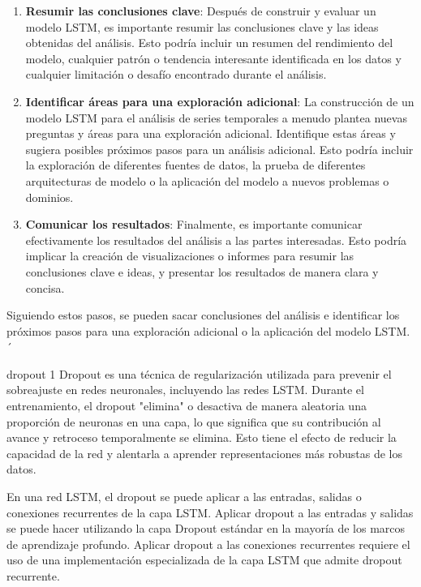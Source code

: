 \documentclass[11pt]{article}
\begin{document}
\begin{enumerate}
\item \textbf{\textbf{Resumir las conclusiones clave}}: Después de construir y evaluar
un modelo LSTM, es importante resumir las conclusiones clave y las
ideas obtenidas del análisis. Esto podría incluir un resumen del
rendimiento del modelo, cualquier patrón o tendencia interesante
identificada en los datos y cualquier limitación o desafío
encontrado durante el análisis.

\item \textbf{\textbf{Identificar áreas para una exploración adicional}}: La
construcción de un modelo LSTM para el análisis de series
temporales a menudo plantea nuevas preguntas y áreas para una
exploración adicional. Identifique estas áreas y sugiera posibles
próximos pasos para un análisis adicional. Esto podría incluir la
exploración de diferentes fuentes de datos, la prueba de diferentes
arquitecturas de modelo o la aplicación del modelo a nuevos
problemas o dominios.

\item \textbf{\textbf{Comunicar los resultados}}: Finalmente, es importante comunicar
efectivamente los resultados del análisis a las partes
interesadas. Esto podría implicar la creación de visualizaciones o
informes para resumir las conclusiones clave e ideas, y presentar
los resultados de manera clara y concisa.
\end{enumerate}

Siguiendo estos pasos, se pueden sacar conclusiones del análisis e
identificar los próximos pasos para una exploración adicional o la
aplicación del modelo LSTM.
´


dropout 1
Dropout es una técnica de regularización utilizada para prevenir el
sobreajuste en redes neuronales, incluyendo las redes LSTM. Durante el
entrenamiento, el dropout "elimina" o desactiva de manera aleatoria
una proporción de neuronas en una capa, lo que significa que su
contribución al avance y retroceso temporalmente se elimina. Esto
tiene el efecto de reducir la capacidad de la red y alentarla a
aprender representaciones más robustas de los datos.

En una red LSTM, el dropout se puede aplicar a las entradas, salidas o
conexiones recurrentes de la capa LSTM. Aplicar dropout a las entradas
y salidas se puede hacer utilizando la capa Dropout estándar en la
mayoría de los marcos de aprendizaje profundo. Aplicar dropout a las
conexiones recurrentes requiere el uso de una implementación
especializada de la capa LSTM que admite dropout recurrente.
\end{document}
